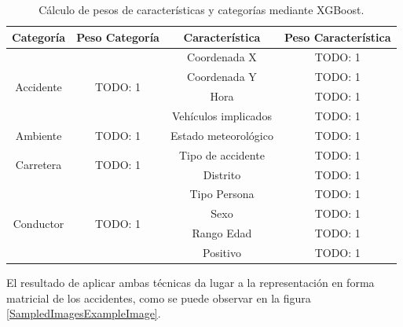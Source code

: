         \begin{table}[H]
          \centering
          \begin{tabular}{ |c|c|c|c| }
               \hline
               \textbf{Categoría} & \textbf{Peso Categoría} & \textbf{Característica} & \textbf{Peso Característica}\\

               \hline
               \multirow{4}{*}{Accidente}   & \multirow{4}{*}{TODO: 1}      & Coordenada X          & TODO: 1\\
                                            &                               & Coordenada Y          & TODO: 1\\
                                            &                               & Hora                  & TODO: 1\\
                                            &                               & Vehículos implicados  & TODO: 1\\

               \hline
               \multirow{1}{*}{Ambiente}    & \multirow{1}{*}{TODO: 1}      & Estado meteorológico  & TODO: 1\\

               \hline
               \multirow{2}{*}{Carretera}   & \multirow{2}{*}{TODO: 1}      & Tipo de accidente     & TODO: 1\\
                                            &                               & Distrito              & TODO: 1\\

               \hline
               \multirow{4}{*}{Conductor}   & \multirow{4}{*}{TODO: 1}      & Tipo Persona          & TODO: 1\\
                                            &                               & Sexo                  & TODO: 1\\
                                            &                               & Rango Edad            & TODO: 1\\
                                            &                               & Positivo              & TODO: 1\\
               \hline
          \end{tabular}
          \caption{Cálculo de pesos de características y categorías mediante XGBoost.}
          \label{PesosFinalesCaracteristicas}
        \end{table}


        El resultado de aplicar ambas técnicas da lugar a la representación en forma matricial de los accidentes, como se puede observar en la figura \ref{SampledImagesExampleImage}.

